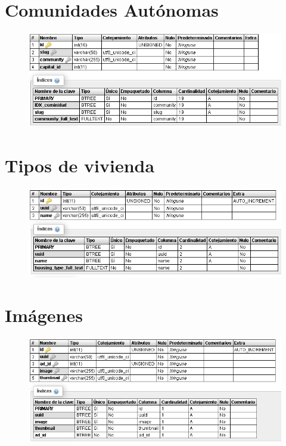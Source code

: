 \section{Comunidades Aut\'{o}nomas}
\begin{figure}[h]
\centering
\includegraphics[width=1\textwidth]{Img/Disenyo/BD_COMMUNITIES.jpg}
\end{figure}

\pagebreak

\section{Tipos de vivienda}
\begin{figure}[h]
\centering
\includegraphics[width=1\textwidth]{Img/Disenyo/BD_HOUSING_TYPES.jpg}
\end{figure}


\section{Im\'{a}genes}
\begin{figure}[h]
\centering
\includegraphics[width=1\textwidth]{Img/Disenyo/BD_IMAGES.jpg}
\end{figure}



